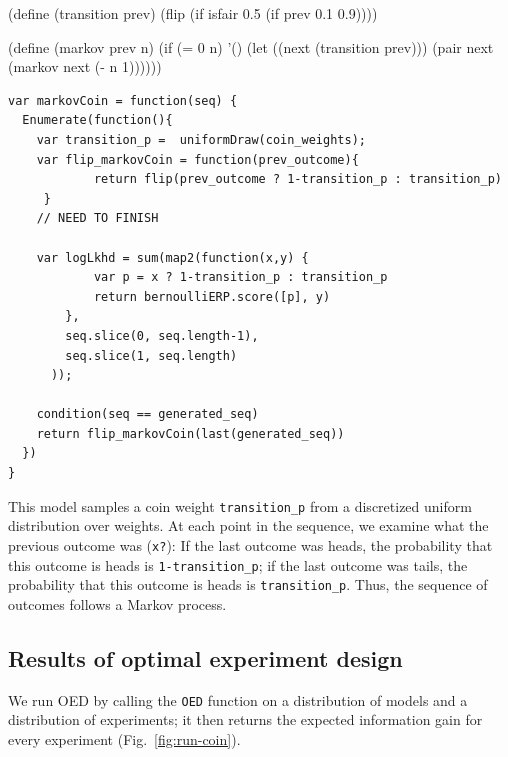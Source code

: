 \documentclass{article}
\begin{document}
   (define (transition prev) (flip (if isfair
                                       0.5
                                       (if prev 0.1 0.9))))

   (define (markov prev n)
     (if (= 0 n)
         '()
         (let ((next (transition prev)))
           (pair next (markov next (- n 1))))))


\begin{lstlisting}[caption=Markov coin model]
var markovCoin = function(seq) {
  Enumerate(function(){
    var transition_p =  uniformDraw(coin_weights);
    var flip_markovCoin = function(prev_outcome){
    		return flip(prev_outcome ? 1-transition_p : transition_p)
	 }
	// NEED TO FINISH

    var logLkhd = sum(map2(function(x,y) {
    		var p = x ? 1-transition_p : transition_p
     	 	return bernoulliERP.score([p], y)
    	},
    	seq.slice(0, seq.length-1),
    	seq.slice(1, seq.length)
	  ));

    condition(seq == generated_seq)
    return flip_markovCoin(last(generated_seq))
  })
}
\end{lstlisting}
%
This model samples a coin weight \lstinline{transition_p} from a discretized uniform distribution over weights.
At each point in the sequence, we examine what the previous outcome was (\lstinline{x?}): If the last outcome was heads, the probability that this outcome is heads is \lstinline{1-transition_p}; if the last outcome was tails, the probability that this outcome is heads is \lstinline{transition_p}. Thus, the sequence of outcomes follows a Markov process.

\subsection{Results of optimal experiment design}

We run OED by calling the \lstinline{OED} function on a distribution of models and a distribution of experiments; it then returns the expected information gain for every experiment (Fig.~\ref{fig:run-coin}).
\end{document}
